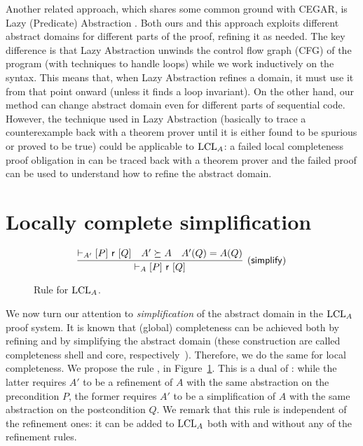 Another related approach, which shares some common ground with CEGAR, is Lazy (Predicate) Abstraction \cite{HJMS02,McMillan06}. Both ours and this approach exploits different abstract domains for different parts of the proof, refining it as needed. The key difference is that Lazy Abstraction unwinds the control flow graph (CFG) of the program (with techniques to handle loops) while we work inductively on the syntax. This means that, when Lazy Abstraction refines a domain, it must use it from that point onward (unless it finds a loop invariant). On the other hand, our method can change abstract domain even for different parts of sequential code. However, the technique used in Lazy Abstraction (basically to trace a counterexample back with a theorem prover until it is either found to be spurious or proved to be true) could be applicable to $\text{LCL}_A$: a failed local completeness proof obligation in  can be traced back with a theorem prover and the failed proof can be used to understand how to refine the abstract domain.

\section{Locally complete simplification}
\begin{figure*}[t]
	\begin{framed}
		\[
		\infer[\lclrule{simplify}]
		{\lcl{A}{P}{\regr}{Q}}
		{\lcl{A'}{P}{\regr}{Q} & A' \succeq A & A'(Q) = A(Q)}
		\]
	\end{framed}
	\vspace{-1ex}
	\caption{Rule  for $\text{LCL}_A$.}\label{fig:lcla:rule-simplify}
\end{figure*}

We now turn our attention to \emph{simplification} of the abstract domain in the $\text{LCL}_A$ proof system. It is known that (global) completeness can be achieved both by refining and by simplifying the abstract domain (these construction are called completeness shell and core, respectively~\cite{GRS00}). Therefore, we do the same for local completeness.
We propose the rule , in Figure~\ref{fig:lcla:rule-simplify}. This is a dual of : while the latter requires $A'$ to be a refinement of $A$ with the same abstraction on the precondition $P$, the former requires $A'$ to be a simplification of $A$ with the same abstraction on the postcondition $Q$. We remark that this rule is independent of the refinement ones: it can be added to $\text{LCL}_A$ both with and without any of the refinement rules.

